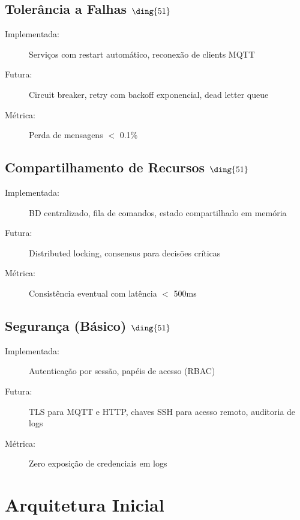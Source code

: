 \documentclass[12pt,a4paper,oneside]{report}
\newcommand{\checkmark}{\text{\ding{51}}}
\begin{document}
\section{Tolerância a Falhas $\checkmark$}

\begin{description}
    \item[Implementada:] Serviços com restart automático, reconexão de clients MQTT
    \item[Futura:] Circuit breaker, retry com backoff exponencial, dead letter queue
    \item[Métrica:] Perda de mensagens $<$ 0.1\%
\end{description}

\section{Compartilhamento de Recursos $\checkmark$}

\begin{description}
    \item[Implementada:] BD centralizado, fila de comandos, estado compartilhado em memória
    \item[Futura:] Distributed locking, consensus para decisões críticas
    \item[Métrica:] Consistência eventual com latência $<$ 500ms
\end{description}

\section{Segurança (Básico) $\checkmark$}

\begin{description}
    \item[Implementada:] Autenticação por sessão, papéis de acesso (RBAC)
    \item[Futura:] TLS para MQTT e HTTP, chaves SSH para acesso remoto, auditoria de logs
    \item[Métrica:] Zero exposição de credenciais em logs
\end{description}

\chapter{Arquitetura Inicial}
\end{document}
